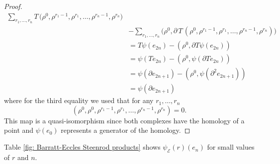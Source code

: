 \begin{proof}
\begin{align*}
	\sum_{r_1, \dots, r_n}
	T \, \big( \rho^0, \rho^{r_1-1}, \rho^{r_1}, \dots, \rho^{r_n - 1}, \rho^{r_n} \big) \\ & -
	\sum_{r_1, \dots, r_n}
	\big(\rho^0, \partial \, T \, (\rho^0, \rho^{r_1-1}, \rho^{r_1}, \dots, \rho^{r_n - 1}, \rho^{r_n}) \big) \\ & =
	T \psi(e_{2n}) - (\rho^0, \partial T \psi (e_{2n})) \\ & =
	\psi(T e_{2n}) - (\rho^0, \psi (\partial T e_{2n})) \\ & =
	\psi(\partial e_{2n+1}) - (\rho^0, \psi (\partial^2 e_{2n+1})) \\ & =
	\psi(\partial e_{2n+1})
	\end{align*}
	where for the third equality we used that for any $r_1, \dots, r_n$
	\begin{equation*}
	(\rho^0, \rho^0, \rho^{r_1-1}, \rho^{r_1}, \dots, \rho^{r_n - 1}, \rho^{r_n}) = 0.
	\end{equation*}
	This map is a quasi-isomorphism since both complexes have the homology of a point and $\psi(e_0)$ represents a generator of the homology.
\end{proof}

\begin{example}
	Table \ref{fig: Barratt-Eccles Steenrod products} shows $\psi_{\mathcal E}(r)(e_n)$ for small values of $r$ and $n$.
\end{example}

\begin{table}[h]
	\centering
	\vspace*{3pt}
	\caption{The elements $\psi_{\mathcal E}(r)(e_n)$ for small values of $r$ and $n$ where we are denoting $(\rho^{r_0}, \dots, \rho^{r_n})$ simply by $(r_0, \dots, r_n)$.}
	\label{fig: Barratt-Eccles Steenrod products}
\end{table}

